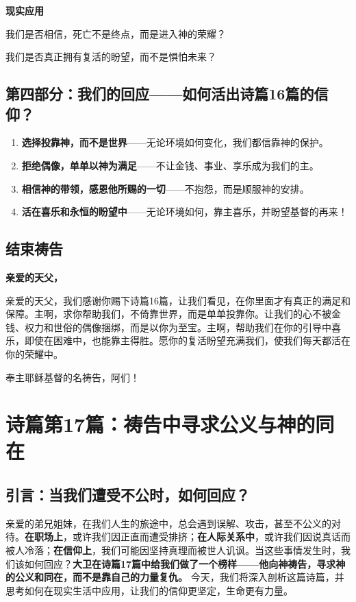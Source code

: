 \documentclass[a4paper, 12pt]{article}
\begin{document}
\textbf{现实应用}

\hspace{0.6cm}我们是否相信，死亡不是终点，而是进入神的荣耀？ 


\hspace{0.6cm}我们是否真正拥有复活的盼望，而不是惧怕未来？  

\subsection*{第四部分：我们的回应——如何活出诗篇16篇的信仰？  }

\begin{enumerate}
    \item \textbf{选择投靠神，而不是世界}——无论环境如何变化，我们都信靠神的保护。  
    \item \textbf{拒绝偶像，单单以神为满足}——不让金钱、事业、享乐成为我们的主。  

    \item \textbf{相信神的带领，感恩他所赐的一切}——不抱怨，而是顺服神的安排。  

    \item \textbf{活在喜乐和永恒的盼望中}——无论环境如何，靠主喜乐，并盼望基督的再来！  

    
\end{enumerate}

\subsection*{结束祷告}
\textbf{亲爱的天父，}

亲爱的天父，我们感谢你赐下诗篇16篇，让我们看见，在你里面才有真正的满足和保障。主啊，求你帮助我们，不倚靠世界，而是单单投靠你。让我们的心不被金钱、权力和世俗的偶像捆绑，而是以你为至宝。主啊，帮助我们在你的引导中喜乐，即使在困难中，也能靠主得胜。愿你的复活盼望充满我们，使我们每天都活在你的荣耀中。

奉主耶稣基督的名祷告，阿们！

\newpage
\section{诗篇第17篇：祷告中寻求公义与神的同在}

\subsection*{引言：当我们遭受不公时，如何回应？ }
亲爱的弟兄姐妹，在我们人生的旅途中，总会遇到误解、攻击，甚至不公义的对待。\textbf{在职场上}，或许我们因正直而遭受排挤；\textbf{在人际关系中}，或许我们因说真话而被人冷落；\textbf{在信仰上}，我们可能因坚持真理而被世人讥讽。当这些事情发生时，我们该如何回应？\textbf{大卫在诗篇17篇中给我们做了一个榜样——他向神祷告，寻求神的公义和同在，而不是靠自己的力量复仇。} 今天，我们将深入剖析这篇诗篇，并思考如何在现实生活中应用，让我们的信仰更坚定，生命更有力量。  
\end{document}
